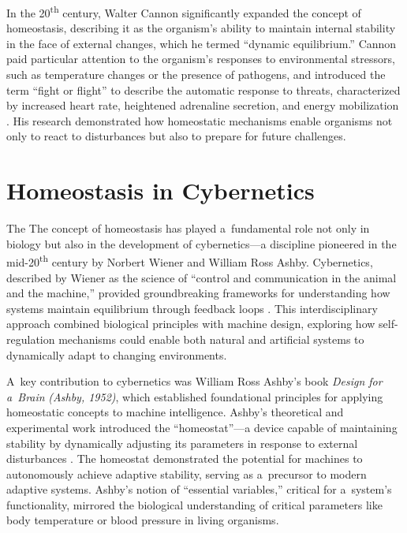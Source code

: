 \documentclass[%
  manuscript=article,
  year=2024,
  volume=77,
  doi=00000.000,
]{zfn}
\begin{document}
In the 20\textsuperscript{th} century, Walter Cannon significantly expanded the concept of homeostasis, describing it as the organism's ability to maintain internal stability in the face of external changes, which he termed ``dynamic equilibrium.'' Cannon paid particular attention to the organism's responses to environmental stressors, such as temperature changes or the presence of pathogens, and introduced the term ``fight or flight'' to describe the automatic response to threats, characterized by increased heart rate, heightened adrenaline secretion, and energy mobilization 
\parencite[][]{modell_physiologists_2015}. %
 His research demonstrated how homeostatic mechanisms enable organisms not only to react to disturbances but also to prepare for future challenges.



\section*{Homeostasis in Cybernetics}

The The concept of homeostasis has played a~fundamental role not only in biology but also in the development of cybernetics---a discipline pioneered in the mid-20\textsuperscript{th} century by Norbert Wiener and William Ross Ashby. Cybernetics, described by Wiener as the science of ``control and communication in the animal and the machine,'' provided groundbreaking frameworks for understanding how systems maintain equilibrium through feedback loops 
\parencite[][]{wiener_cybernetics_1965}. %
 This interdisciplinary approach combined biological principles with machine design, exploring how self-regulation mechanisms could enable both natural and artificial systems to dynamically adapt to changing environments.



A~key contribution to cybernetics was William Ross Ashby's book \textit{Design for a~Brain} \label{ref:RND4QBhH4WIOz}\textit{(Ashby, 1952)}, which established foundational principles for applying homeostatic concepts to machine intelligence. Ashby's theoretical and experimental work introduced the ``homeostat''---a device capable of maintaining stability by dynamically adjusting its parameters in response to external disturbances 
\parencite[][]{ashby_design_1952}. %
 The homeostat demonstrated the potential for machines to autonomously achieve adaptive stability, serving as a~precursor to modern adaptive systems. Ashby's notion of ``essential variables,'' critical for a~system's functionality, mirrored the biological understanding of critical parameters like body temperature or blood pressure in living organisms.
\end{document}
